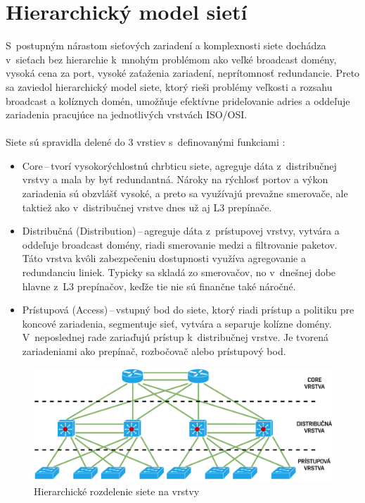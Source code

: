 \section{Hierarchický model sietí}
S~postupným nárastom sieťových zariadení a komplexnosti siete dochádza v~sieťach bez hierarchie k~mnohým problémom ako veľké broadcast domény, vysoká cena za port, vysoké zaťaženia zariadení, neprítomnosť redundancie. Preto sa zaviedol hierarchický model siete, ktorý rieši problémy veľkosti a rozsahu broadcast a kolíznych domén, umožňuje efektívne prideľovanie  adries a oddeľuje zariadenia pracujúce na jednotlivých vrstvách ISO/OSI.  
\\\\
\noindent
Siete sú spravidla delené do 3 vrstiev s~definovanými funkciami \cite{Lammle2013}:
\begin{itemize}
	\item Core\,--\,tvorí vysokorýchlostnú chrbticu siete, agreguje dáta z~distribučnej vrstvy a mala by byť redundantná. Nároky na rýchlosť portov a výkon zariadenia sú obzvlášť vysoké, a preto sa využívajú prevažne smerovače, ale taktiež ako v~distribučnej vrstve dnes už aj L3 prepínače.
	\item Distribučná (Distribution)\,--\,agreguje dáta z~prístupovej vrstvy, vytvára a oddeľuje broadcast domény, riadi smerovanie medzi  a  filtrovanie paketov. Táto vrstva kvôli zabezpečeniu dostupnosti využíva agregovanie  a redundanciu liniek. Typicky sa skladá zo smerovačov, no v~dnešnej dobe hlavne z~L3 prepínačov, keďže tie nie sú finančne také náročné. 
	\item Prístupová (Access)\,--\,vstupný bod do siete, ktorý riadi prístup a politiku pre koncové zariadenia, segmentuje sieť, vytvára a separuje kolízne domény. V~neposlednej rade zariaďujú prístup k~distribučnej vrstve. Je tvorená zariadeniami ako prepínač, rozbočovač alebo prístupový bod.
\end{itemize} 
\vspace{2em}
\begin{figure}[H]
	\begin{center}
		\includegraphics[scale=0.9]{obrazky/hierarchy_network.pdf}
	\end{center}

	\caption[Hierarchické rozdelenie siete na vrstvy]{Hierarchické rozdelenie siete na vrstvy}
	\label{fig:net-hierarchy}
\end{figure} 


